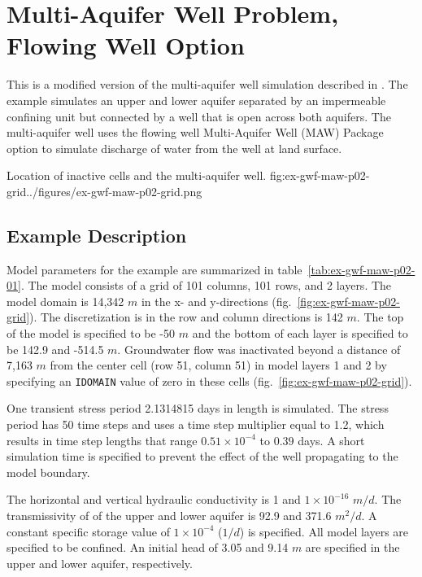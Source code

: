 \section{Multi-Aquifer Well Problem, Flowing Well Option}

This is a modified version of the multi-aquifer well simulation described in \cite{nevilletonkin2004}. The example simulates an upper and lower aquifer separated by an impermeable confining unit but connected by a well that is open across both aquifers. The multi-aquifer well uses the flowing well Multi-Aquifer Well (MAW) Package option to simulate discharge of water from the well at land surface.                               

\begin{StandardFigure}{
                                     Location of inactive cells and the multi-aquifer well. 
                                     }{fig:ex-gwf-maw-p02-grid}{../figures/ex-gwf-maw-p02-grid.png}
\end{StandardFigure}   


\subsection{Example Description}
Model parameters for the example are summarized in table~\ref{tab:ex-gwf-maw-p02-01}.  The model consists of a grid of 101 columns, 101 rows, and 2 layers. The model domain is 14,342 $m$ in the x- and y-directions (fig.~\ref{fig:ex-gwf-maw-p02-grid}). The discretization is in the row and column directions is 142 $m$. The top of the model is specified to be -50 $m$ and the bottom of each layer is specified to be 142.9 and -514.5 $m$. Groundwater flow was inactivated beyond a distance of 7,163 $m$ from the center cell (row 51, column 51) in model layers 1 and 2 by specifying an \texttt{IDOMAIN} value of zero in these cells (fig.~\ref{fig:ex-gwf-maw-p02-grid}).

One transient stress period 2.1314815 days in length is simulated. The stress period has 50 time steps and uses a time step multiplier equal to 1.2, which results in time step lengths that range $0.51 \times 10^{-4}$ to $0.39$ days. A short simulation time is specified to prevent the effect of the well propagating to the model boundary.



The horizontal and vertical hydraulic conductivity is 1 and $1 \times 10^{-16}$ $m/d$. The transmissivity of of the upper and lower aquifer is 92.9 and 371.6 $m^2/d$. A constant specific storage value of $1 \times 10^{-4}$ ($1/d$) is specified. All model layers are specified to be confined. An initial head of 3.05 and 9.14 $m$ are specified in the upper and lower aquifer, respectively. 

